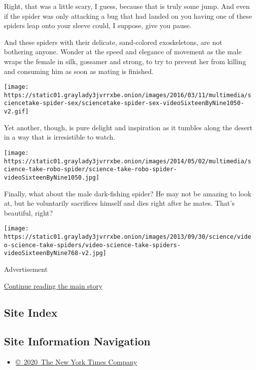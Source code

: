 Right, that was a little scary, I guess, because that is truly some
jump. And even if the spider was only attacking a bug that had landed on
you having one of these spiders leap onto your sleeve could, I suppose,
give you pause.

And these spiders with their delicate, sand-colored exoskeletons, are
not bothering anyone. Wonder at the speed and elegance of movement as
the male wraps the female in silk, gossamer and strong, to try to
prevent her from killing and consuming him as soon as mating is
finished.

\texttt{[image: https://static01.graylady3jvrrxbe.onion/images/2016/03/11/multimedia/sciencetake-spider-sex/sciencetake-spider-sex-videoSixteenByNine1050-v2.gif]}

Yet another, though, is pure delight and inspiration as it tumbles along
the desert in a way that is irresistible to watch.

\texttt{[image: https://static01.graylady3jvrrxbe.onion/images/2014/05/02/multimedia/science-take-robo-spider/science-take-robo-spider-videoSixteenByNine1050.jpg]}

Finally, what about the male dark-fishing spider? He may not be amazing
to look at, but he voluntarily sacrifices himself and dies right after
he mates. That's beautiful, right?

\texttt{[image: https://static01.graylady3jvrrxbe.onion/images/2013/09/30/science/video-science-take-spiders/video-science-take-spiders-videoSixteenByNine768-v2.jpg]}

Advertisement

\protect\hyperlink{after-bottom}{Continue reading the main story}

\hypertarget{site-index}{%
\subsection{Site Index}\label{site-index}}

\hypertarget{site-information-navigation}{%
\subsection{Site Information
Navigation}\label{site-information-navigation}}

\begin{itemize}
\tightlist
\item
  \href{https://help.nytimes3xbfgragh.onion/hc/en-us/articles/115014792127-Copyright-notice}{©~2020~The
  New York Times Company}
\end{itemize}

